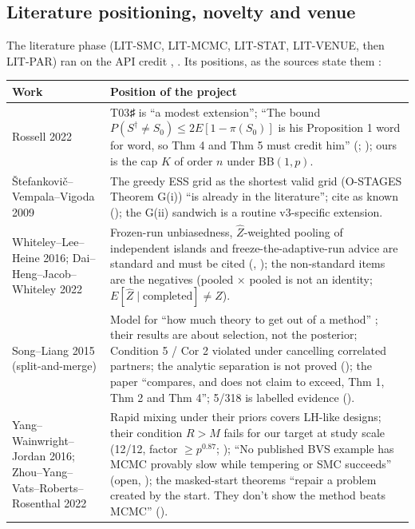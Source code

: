 \subsection{Literature positioning, novelty and venue}\label{sec:history:lit}

The literature phase (LIT-SMC, LIT-MCMC, LIT-STAT, LIT-VENUE, then LIT-PAR) ran on the API credit , . Its positions, as the sources state them :

{\small
\begin{xltabular}{\textwidth}{@{}>{\raggedright\arraybackslash}p{3.8cm}>{\raggedright\arraybackslash}X@{}}
\toprule
\textbf{Work} & \textbf{Position of the project} \\
\midrule
\endhead
Rossell 2022 & T03♯ is ``a modest extension''; ``The bound $P(S^\dagger\neq S_0)\le 2E[1-\pi(S_0)]$ is his Proposition 1 word for word, so Thm 4 and Thm 5 must credit him'' (; ); ours is the cap $K$ of order $n$ under BB$(1,p)$. \\
Štefankovič--Vempala--Vigoda 2009 & The greedy ESS grid as the shortest valid grid (O-STAGES Theorem G(i)) ``is already in the literature''; cite as known (); the G(ii) sandwich is a routine v3-specific extension. \\
Whiteley--Lee--Heine 2016; Dai--Heng--Jacob--Whiteley 2022 & Frozen-run unbiasedness, $\hat Z$-weighted pooling of independent islands and freeze-the-adaptive-run advice are standard and must be cited (, ); the non-standard items are the negatives (pooled × pooled is not an identity; $E[\hat Z\mid\text{completed}]\neq Z$). \\
Song--Liang 2015 (split-and-merge) & Model for ``how much theory to get out of a method'' ; their results are about selection, not the posterior; Condition 5 / Cor 2 violated under cancelling correlated partners; the analytic separation is not proved (); the paper ``compares, and does not claim to exceed, Thm 1, Thm 2 and Thm 4''; 5/318 is labelled evidence (). \\
Yang--Wainwright--Jordan 2016; Zhou--Yang--Vats--\allowbreak Roberts--\allowbreak Rosenthal 2022 & Rapid mixing under their priors covers LH-like designs; their condition $R>M$ fails for our target at study scale (12/12, factor $\ge p^{0.87}$; ); ``No published BVS example has MCMC provably slow while tempering or SMC succeeds'' (open, ); the masked-start theorems ``repair a problem created by the start. They don't show the method beats MCMC'' (). \\

\end{xltabular}}
